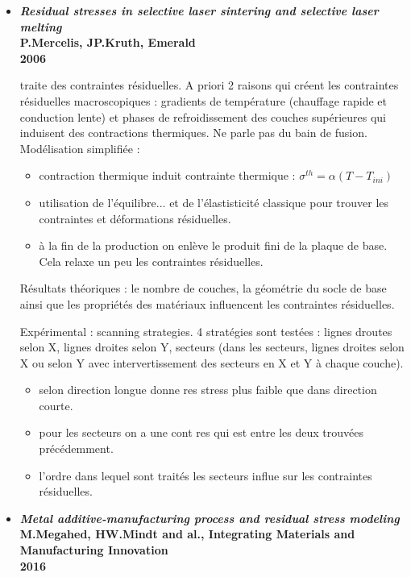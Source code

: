 \documentclass[11pt,a4paper]{article}
\begin{document}
\begin{itemize}
	
	\item \textbf{\emph{Residual stresses in selective laser sintering and selective laser melting} \\
		P.Mercelis, JP.Kruth, Emerald \\
		2006} 
		
	\vspace{0cm}
	
		traite des contraintes résiduelles. A priori 2 raisons qui créent les contraintes résiduelles macroscopiques : gradients de température (chauffage rapide et conduction lente) et phases de refroidissement des couches supérieures qui induisent des contractions thermiques. Ne parle pas du bain de fusion.  Modélisation simplifiée :
		
		\begin{itemize}
			\item contraction thermique induit contrainte thermique : $\sigma^{th}=\alpha(T-T_{ini})$
			\item utilisation de l'équilibre... et de l'élastisticité classique pour trouver les contraintes et déformations résiduelles.
			\item à la fin de la production on enlève le produit fini de la plaque de base. Cela relaxe un peu les contraintes résiduelles.
		\end{itemize}	
		
		Résultats théoriques : le nombre de couches, la géométrie du socle de base ainsi que les propriétés des matériaux influencent les contraintes résiduelles.
		
		\vspace{0cm}
		
		Expérimental : scanning strategies. 4 stratégies sont testées : lignes droutes selon X, lignes droites selon Y, secteurs (dans les secteurs, lignes droites selon X ou selon Y avec intervertissement des secteurs en X et Y à chaque couche). 
		\begin{itemize}
			\item selon direction longue donne res stress plus faible que dans direction courte.
			\item pour les secteurs on a une cont res qui est entre les deux trouvées précédemment.
			\item l'ordre dans lequel sont traités les secteurs influe sur les contraintes résiduelles.
		\end{itemize}
		
		
		
		
		\item \textbf{\emph{Metal additive-manufacturing process and residual stress modeling} \\
			M.Megahed, HW.Mindt and al., Integrating Materials and Manufacturing Innovation \\
			2016}
		

\end{itemize}
\end{document}
